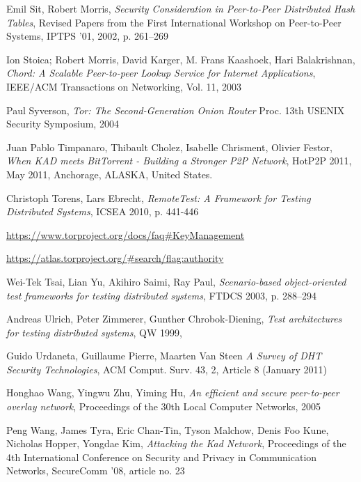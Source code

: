 \begin{thebibliography}{99}
  Emil Sit, Robert Morris,
  \textit{Security Consideration in Peer-to-Peer Distributed Hash Tables},
  Revised Papers from the First International Workshop on Peer-to-Peer Systems,
  IPTPS '01, 2002, p. 261--269

  Ion Stoica; Robert Morris, David Karger, M. Frans Kaashoek, Hari Balakrishnan,
  \textit{Chord: A Scalable Peer-to-peer Lookup Service for Internet
  Applications},
  IEEE/ACM Transactions on Networking, Vol. 11, 2003

  Paul Syverson,
  \textit{Tor: The Second-Generation Onion Router}
  Proc. 13th USENIX Security Symposium,
  2004

  Juan Pablo Timpanaro, Thibault Cholez, Isabelle Chrisment, Olivier Festor,
  \textit{When KAD meets BitTorrent - Building a Stronger P2P Network},
  HotP2P 2011, May 2011, Anchorage, ALASKA, United States.

  Christoph Torens, Lars Ebrecht,
  \textit{RemoteTest: A Framework for Testing Distributed Systems},
  ICSEA 2010, p. 441-446

  \url{https://www.torproject.org/docs/faq\#KeyManagement}

  \url{https://atlas.torproject.org/\#search/flag:authority}

  Wei-Tek Tsai, Lian Yu, Akihiro Saimi, Ray Paul,
  \textit{Scenario-based object-oriented test frameworks for testing distributed
  systems},
  FTDCS 2003, p. {288--294}

  Andreas Ulrich, Peter Zimmerer, Gunther Chrobok-Diening,
  \textit{Test architectures for testing distributed systems},
  QW 1999,

 Guido Urdaneta, Guillaume Pierre, Maarten Van Steen
\textit{A Survey of DHT Security Technologies}, ACM Comput. Surv.  43, 2,
Article 8 (January 2011)

  Honghao Wang, Yingwu Zhu, Yiming Hu,
  \textit{An efficient and secure peer-to-peer overlay network}, 
  Proceedings of the 30th Local Computer Networks,
  2005

  Peng Wang, James Tyra, Eric Chan-Tin, Tyson Malchow, Denis Foo Kune, Nicholas
  Hopper, Yongdae Kim,
  \textit{Attacking the Kad Network},
  Proceedings of the 4th International Conference on Security and Privacy in
  Communication Networks, SecureComm '08, article no. 23


\end{thebibliography}
